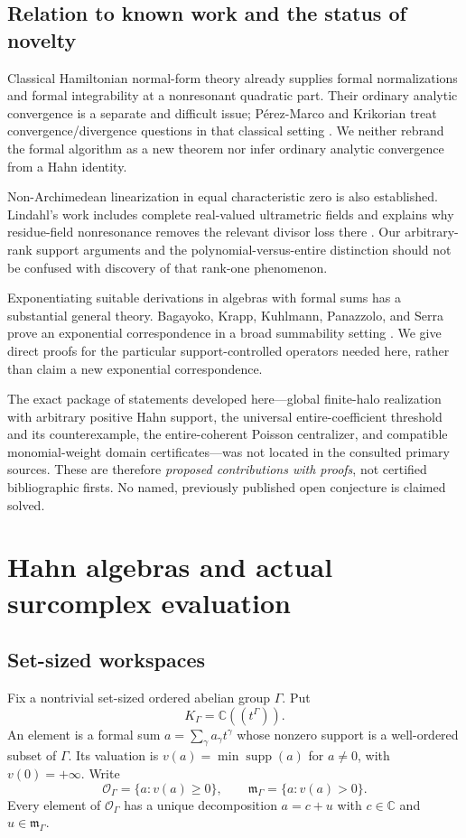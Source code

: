 \documentclass[11pt,letterpaper]{article}
\numberwithin{equation}{section}
\theoremstyle{definition}
\theoremstyle{remark}
\newcommand{\C}{\mathbb C}
\newcommand{\OO}{\mathcal O}
\newcommand{\mm}{\mathfrak m}
\newcommand{\supp}{\operatorname{supp}}
\begin{document}
\subsection{Relation to known work and the status of novelty}
Classical Hamiltonian normal-form theory already supplies formal
normalizations and formal integrability at a nonresonant quadratic part.
Their ordinary analytic convergence is a separate and difficult issue;
P\'erez-Marco and Krikorian treat convergence/divergence questions in that
classical setting \cite{perezmarco,krikorian}. We neither rebrand the formal
algorithm as a new theorem nor infer ordinary analytic convergence from a
Hahn identity.

Non-Archimedean linearization in equal characteristic zero is also
established. Lindahl's work includes complete real-valued ultrametric fields
and explains why residue-field nonresonance removes the relevant divisor
loss there \cite{lindahl}. Our arbitrary-rank support arguments and the
polynomial-versus-entire distinction should not be confused with discovery
of that rank-one phenomenon.

Exponentiating suitable derivations in algebras with formal sums has a
substantial general theory. Bagayoko, Krapp, Kuhlmann, Panazzolo, and Serra
prove an exponential correspondence in a broad summability setting
\cite{bagayoko}. We give direct proofs for the particular support-controlled
operators needed here, rather than claim a new exponential correspondence.

The exact package of statements developed here---global finite-halo
realization with arbitrary positive Hahn support, the universal
entire-coefficient threshold and its counterexample, the entire-coherent
Poisson centralizer, and compatible monomial-weight domain certificates---was
not located in the consulted primary sources. These are therefore
\emph{proposed contributions with proofs}, not certified bibliographic
firsts. No named, previously published open conjecture is claimed solved.

\section{Hahn algebras and actual surcomplex evaluation}
\label{sec:hahn}

\subsection{Set-sized workspaces}
Fix a nontrivial set-sized ordered abelian group $\Gamma$. Put
\[
 K_\Gamma=\C((t^\Gamma)).
\]
An element is a formal sum $a=\sum_\gamma a_\gamma t^\gamma$ whose nonzero
support is a well-ordered subset of $\Gamma$. Its valuation is
$v(a)=\min\supp(a)$ for $a\ne0$, with $v(0)=+\infty$. Write
\[
 \OO_\Gamma=\{a:v(a)\ge0\},\qquad
 \mm_\Gamma=\{a:v(a)>0\}.
\]
Every element of $\OO_\Gamma$ has a unique decomposition $a=c+u$ with
$c\in\C$ and $u\in\mm_\Gamma$.
\end{document}
